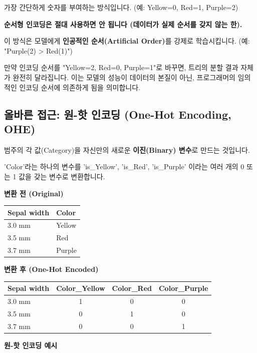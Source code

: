 \documentclass[11pt,a4paper]{book}
\providecommand{\captionof}[2]{\textbf{#2}}
\theoremstyle{definition}
\begin{document}
가장 간단하게 숫자를 부여하는 방식입니다. (예: Yellow=0, Red=1, Purple=2)

\begin{boxWarning}
    \textbf{순서형 인코딩은 절대 사용하면 안 됩니다 (데이터가 실제 순서를 갖지 않는 한).}
    
    이 방식은 모델에게 \textbf{인공적인 순서(Artificial Order)}를 강제로 학습시킵니다.
    (예: "Purple(2) > Red(1)")
    
    만약 인코딩 순서를 "Yellow=2, Red=0, Purple=1"로 바꾸면, 트리의 분할 결과 자체가 완전히 달라집니다. 이는 모델의 성능이 데이터의 본질이 아닌, 프로그래머의 임의적인 인코딩 순서에 의존하게 됨을 의미합니다.
\end{boxWarning}

\subsection{올바른 접근: 원-핫 인코딩 (One-Hot Encoding, OHE)}

범주의 각 값(Category)을 자신만의 새로운 \textbf{이진(Binary) 변수}로 만드는 것입니다.

\begin{boxDefinition}[title={원-핫 인코딩 (OHE)}]
    'Color'라는 하나의 변수를 'is\_Yellow', 'is\_Red', 'is\_Purple' 이라는 여러 개의 0 또는 1 값을 갖는 변수로 변환합니다.
\end{boxDefinition}

\begin{boxExample}
    \textbf{변환 전 (Original)}
    \begin{tabular}{l l} \toprule
    Sepal width & Color \\ \midrule
    3.0 mm & Yellow \\
    3.5 mm & Red \\
    3.7 mm & Purple \\ \bottomrule
    \end{tabular}
    
    \vspace{1em}
    \textbf{변환 후 (One-Hot Encoded)}
    \begin{tabular}{l c c c} \toprule
    Sepal width & Color\_Yellow & Color\_Red & Color\_Purple \\ \midrule
    3.0 mm & 1 & 0 & 0 \\
    3.5 mm & 0 & 1 & 0 \\
    3.7 mm & 0 & 0 & 1 \\ \bottomrule
    \end{tabular}
    \captionof{table}{원-핫 인코딩 예시}
\end{boxExample}
\end{document}
